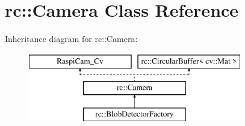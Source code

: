 \hypertarget{classrc_1_1Camera}{\section{rc\+:\+:Camera Class Reference}
\label{classrc_1_1Camera}
}
Inheritance diagram for rc\+:\+:Camera\+:\begin{figure}[H]
\begin{center}
\leavevmode
\includegraphics[height=3.000000cm]{classrc_1_1Camera}
\end{center}
\end{figure}
